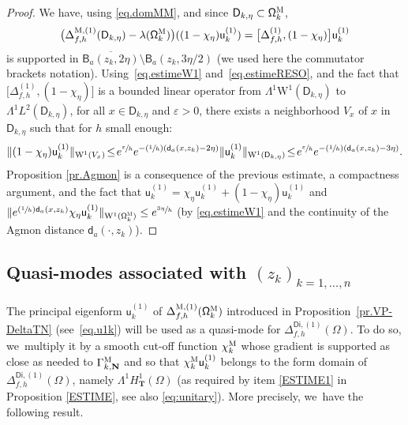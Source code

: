 \documentclass[10pt]{amsart}
\newcommand{\Psfrac}[2]{(\sfrac{#1}{#2})}
\let\epsilon\varepsilon
\newcommand{\mbf}[1]{\mathbf{#1}}
\theoremstyle{plain}
\theoremstyle{definition}
\begin{document}
\begin{proof}
We have, using \eqref{eq.domMM}, and since $\mathsf D_{k,\eta}\subset \mathsf \Omega_k^{\textsc{M}}$,
\[
\bigl(\Delta_{f,h}^{\text{M}, (1)} (\mathsf D_{k,\eta}) - \lambda(\mathsf \Omega_k^{\textsc{M}}) \bigr) ((1-\chi_\eta)\mathsf u^{(1)}_k)= \big [ \Delta_{f,h}^{ (1)},(1-\chi_\eta)\big] \mathsf u^{(1)}_k
\]
is supported in $\overline{\mathsf B_{a}(z_k,2\eta)}\setminus \mathsf
B_{a}(z_k,3\eta/2)$ (we used here the commutator brackets notation).
Using~\eqref{eq.estimeW1} and~\eqref{eq.estimeRESO}, and the fact
that $\big [ \Delta_{f,h}^{ (1)},(1-\chi_\eta)\big] $ is a
bounded linear operator from $\Lambda^1\mathrm{W}^1(\mathsf
D_{k,\eta})$ to $\Lambda^1L^2(\mathsf D_{k,\eta})$, for all $x\in
\mathsf D_{k,\eta}$ and $\epsilon>0$, there exists a
neighborhood $V_x$ of $x$ in $\mathsf D_{k,\eta}$ such that for
$h$ small enough:
\[
\Vert (1-\chi_\eta)\mathsf u^{(1)}_k \Vert_{\mathrm W^1(V_x)} \!\le\! e^{\sfrac \epsilon h} e^{-\Psfrac 1h(\mathsf d_a(x,z_k)-2\eta)} \Vert \mathsf u^{(1)}_k \Vert _{\mathrm W^1(\mathsf D_{k,\eta})}\!\le\! e^{\sfrac \epsilon h} e^{-\Psfrac 1h(\mathsf d_a(x,z_k)-3\eta)}.
\]
Proposition \ref{pr.Agmon} is a consequence of the previous estimate,
a compactness argument, and the fact that $ \mathsf
u^{(1)}_k=\chi_\eta\mathsf u^{(1)}_k+(1-\chi_\eta)\mathsf u^{(1)}_k$
and $\Vert e^{\Psfrac 1h \mathsf d_a(x,z_k) } \chi_\eta \mathsf u^{(1)}_k \Vert _{\mathrm W^1(\mathsf \Omega_k^{\textsc{M}})}\le e^{\sfrac {3\eta}{h}}$ (by \eqref{eq.estimeW1} and the continuity of the Agmon distance $\mathsf d_a(\cdot,z_k)$).
\end{proof}

\subsection{Quasi-modes associated with $(z_k)_{k=1,\ldots,n}$}\label{sec:vk1}
The principal eigenform $\mathsf u^{(1)}_k$ of
$\Delta_{f,h}^{\textsc{M},(1)} (\mathsf \Omega_k^{\textsc{M}})$
introduced in Proposition~\ref{pr.VP-DeltaTN} (see~\eqref{eq.u1k}) will be used as a quasi-mode for $\Delta_{f,h}^{\mathsf{Di},(1)} (\Omega) $. To do so, we~multiply it by a smooth cut-off function $\chi_k^{\textsc{M}} $ whose gradient is supported as close as needed to $\Gamma_{k,\mbf N}^{\textsc{M}}$ and so that $\chi_k^{\textsc{M}} \mathsf u^{(1)}_k$ belongs to the form domain of $\Delta_{f,h}^{\mathsf{Di},(1)} (\Omega) $, namely $\Lambda^1H^1_{\mbf T}(\Omega) $ (as required by item \eqref{ESTIME1} in Proposition \ref{ESTIME}, see also \eqref{eq:unitary}). More precisely, we~have the following result.
\end{document}
